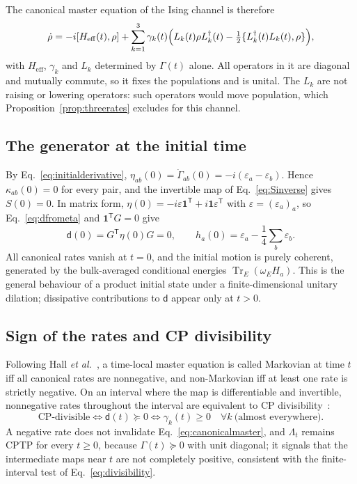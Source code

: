 \documentclass[11pt,a4paper]{article}
\newcommand{\Tr}{\operatorname{Tr}}
\newcommand{\dmat}{\mathsf d}
\newcommand{\Heff}{H_{\mathrm{eff}}}
\begin{document}
The canonical master equation of the Ising channel is therefore
\begin{equation}
 \dot\rho=-i[\Heff(t),\rho]+\sum_{k=1}^3\gamma_k(t)
 \Bigl(L_k(t)\rho L_k^\dagger(t)
 -\tfrac12\{L_k^\dagger(t)L_k(t),\rho\}\Bigr),
 \label{eq:canonicalmaster}
\end{equation}
with $\Heff$, $\gamma_k$ and $L_k$ determined by $\Gamma(t)$ alone. All
operators in it are diagonal and mutually commute, so it fixes the
populations and is unital. The $L_k$ are not raising or lowering
operators: such operators would move population, which
Proposition~\ref{prop:threerates} excludes for this channel.

\subsection{The generator at the initial time}
\label{sec:initial}

By Eq.~\eqref{eq:initialderivative},
$\eta_{ab}(0)=\dot\Gamma_{ab}(0)=-i(\varepsilon_a-\varepsilon_b)$.
Hence $\kappa_{ab}(0)=0$ for every pair, and the invertible map of
Eq.~\eqref{eq:Sinverse} gives $S(0)=0$. In matrix form,
$\eta(0)=-i\varepsilon\mathbf1^{\mathsf T}+i\mathbf1\varepsilon^{\mathsf T}$
with $\varepsilon=(\varepsilon_a)_a$, so Eq.~\eqref{eq:dfrometa} and
$\mathbf1^{\mathsf T}G=0$ give
\begin{equation}
 \dmat(0)=G^{\mathsf T}\eta(0)G=0,\qquad
 h_a(0)=\varepsilon_a-\frac14\sum_b\varepsilon_b .
\end{equation}
All canonical rates vanish at $t=0$, and the initial motion is purely
coherent, generated by the bulk-averaged conditional energies
$\Tr_E(\omega_EH_a)$. This is the general behaviour of a product initial
state under a finite-dimensional unitary dilation; dissipative
contributions to $\dmat$ appear only at $t>0$.

\subsection{Sign of the rates and CP divisibility}
\label{sec:ratesign}

Following Hall \emph{et al.}~\cite{Hall2014}, a time-local master
equation is called Markovian at time $t$ iff all canonical rates are
nonnegative, and non-Markovian iff at least one rate is strictly
negative. On an interval where the map is differentiable and invertible,
nonnegative rates throughout the interval are equivalent to CP
divisibility~\cite{Hall2014}:
\begin{equation}
 \text{CP-divisible}\iff\dmat(t)\succeq0\iff\gamma_k(t)\ge0\quad\forall k
 \ \text{(almost everywhere)}.
\end{equation}
A negative rate does not invalidate Eq.~\eqref{eq:canonicalmaster}, and
$\Lambda_t$ remains CPTP for every $t\ge0$, because $\Gamma(t)\succeq0$
with unit diagonal; it signals that the intermediate maps near $t$ are
not completely positive, consistent with the finite-interval test of
Eq.~\eqref{eq:divisibility}.
\end{document}
